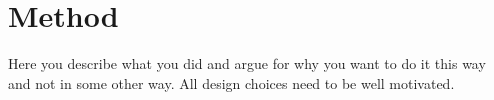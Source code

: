\section{Method}
Here you describe what you did and argue for why you want to do it this way and not in some other way. All design choices need to be well motivated.
